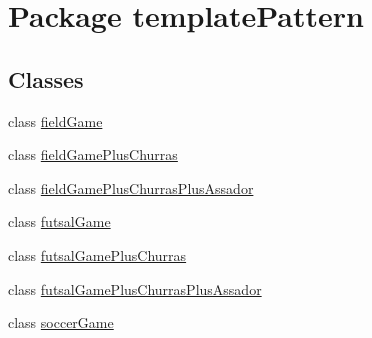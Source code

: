 \hypertarget{namespacetemplate_pattern}{}\section{Package template\+Pattern}
\label{namespacetemplate_pattern}
\subsection*{Classes}
\begin{DoxyCompactItemize}
\item 
class \mbox{\hyperlink{classtemplate_pattern_1_1field_game}{field\+Game}}
\item 
class \mbox{\hyperlink{classtemplate_pattern_1_1field_game_plus_churras}{field\+Game\+Plus\+Churras}}
\item 
class \mbox{\hyperlink{classtemplate_pattern_1_1field_game_plus_churras_plus_assador}{field\+Game\+Plus\+Churras\+Plus\+Assador}}
\item 
class \mbox{\hyperlink{classtemplate_pattern_1_1futsal_game}{futsal\+Game}}
\item 
class \mbox{\hyperlink{classtemplate_pattern_1_1futsal_game_plus_churras}{futsal\+Game\+Plus\+Churras}}
\item 
class \mbox{\hyperlink{classtemplate_pattern_1_1futsal_game_plus_churras_plus_assador}{futsal\+Game\+Plus\+Churras\+Plus\+Assador}}
\item 
class \mbox{\hyperlink{classtemplate_pattern_1_1soccer_game}{soccer\+Game}}
\end{DoxyCompactItemize}
